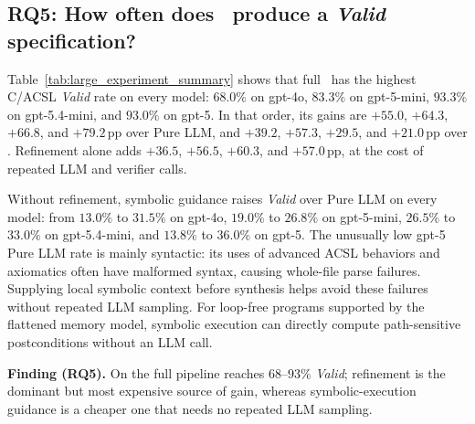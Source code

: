 \subsection{RQ5: How often does \toolname\ produce a \emph{Valid} specification?}
\label{subsec:rq5-valid}



Table~\ref{tab:large_experiment_summary} shows that full \toolname\ has the
highest C/ACSL \emph{Valid} rate on every model: \(68.0\%\) on gpt-4o,
\(83.3\%\) on gpt-5-mini, \(93.3\%\) on gpt-5.4-mini, and \(93.0\%\) on
gpt-5. In that order, its gains are \(+55.0\), \(+64.3\), \(+66.8\), and
\(+79.2\)\,pp over Pure LLM, and \(+39.2\), \(+57.3\), \(+29.5\), and
\(+21.0\)\,pp over \autospec. Refinement alone adds \(+36.5\), \(+56.5\),
\(+60.3\), and \(+57.0\)\,pp, at the cost of repeated LLM and verifier calls.

Without refinement, symbolic guidance raises \emph{Valid} over Pure LLM on
every model: from \(13.0\%\) to \(31.5\%\) on gpt-4o, \(19.0\%\) to
\(26.8\%\) on gpt-5-mini, \(26.5\%\) to \(33.0\%\) on gpt-5.4-mini,
and \(13.8\%\) to \(36.0\%\) on gpt-5. The unusually low gpt-5 Pure LLM
rate is mainly syntactic: its uses of advanced ACSL behaviors and axiomatics
often have malformed syntax, causing whole-file parse failures. Supplying
local symbolic context before synthesis helps avoid these failures without
repeated LLM sampling. For loop-free programs supported by the flattened
memory model, symbolic execution can directly compute path-sensitive
postconditions without an LLM call.


\begin{finding}
\textbf{Finding (RQ5).} On \textbf{} the full pipeline reaches $68$--$93\%$ \emph{Valid}; refinement is the dominant but most expensive source of gain, whereas symbolic-execution guidance is a cheaper one that needs no repeated LLM sampling.
\end{finding}
